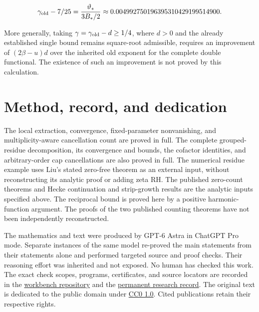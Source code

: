 \documentclass[11pt]{article}
\numberwithin{equation}{section}
\newcommand{\workbenchurl}{https://github.com/KokunoYumeto/zeta-and-l-functions-workbench}
\newcommand{\recordurl}{https://github.com/KokunoYumeto/mathematics-workbenches}
\begin{document}
\begin{equation}\label{res:D12}
\gamma_{\rm old}-7/25
 =\frac{\vartheta_*}{3B_*/2}
 \approx0.004992750196395310429199514900.
\end{equation}

More generally, taking \(\gamma=\gamma_{\rm old}-d\geq1/4\), where
\(d>0\) and the already established single bound remains square-root
admissible, requires an improvement of \((2\beta-u)d\) over the
inherited old exponent for the complete double functional. The existence
of such an improvement is not proved by this calculation.

\section*{Method, record, and dedication}

The local extraction, convergence, fixed-parameter nonvanishing,
and multiplicity-aware cancellation count are proved in full. The complete grouped-residue decomposition, its convergence and bounds, the cofactor identities, and arbitrary-order cap cancellations are also proved in full. The numerical residue example uses Liu's stated zero-free theorem as an external input, without reconstructing its analytic proof or adding zeta RH.
The published zero-count theorems and Hecke continuation and
strip-growth results are the analytic inputs specified above.
The reciprocal bound is proved here by a positive harmonic-function
argument. The proofs of the two published counting theorems have
not been independently reconstructed.

The mathematics and text were produced by GPT-6 Astra in ChatGPT
Pro mode. Separate instances of the same model re-proved the main
statements from their statements alone and performed targeted
source and proof checks. Their reasoning effort was inherited and
not exposed. No human has checked this work. The exact check scopes,
programs, certificates, and source locators are recorded in the
\href{\workbenchurl}{workbench repository} and the
\href{\recordurl}{permanent research record}.
The original text is dedicated to the public domain under
\href{https://creativecommons.org/publicdomain/zero/1.0/}{CC0 1.0}.
Cited publications retain their respective rights.
\end{document}
